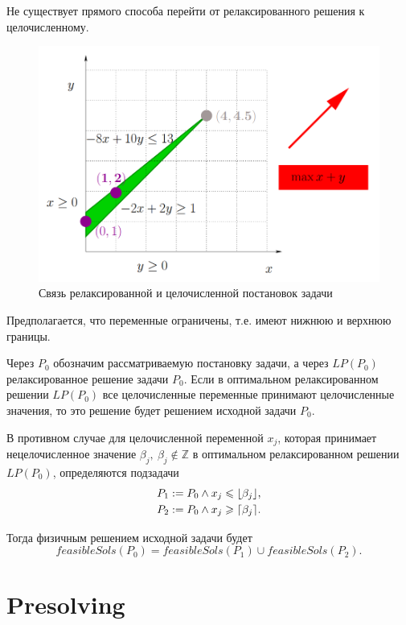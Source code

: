 \documentclass[%
	11pt,
	a4paper,
	utf8,
		]{article}
\begin{document}
Не существует прямого способа перейти от релаксированного решения к целочисленному.

\begin{figure}[h]
	\centering
	\includegraphics[scale=0.55]{figures/lp_and_mip.png}
	\caption{ Связь релаксированной и целочисленной постановок задачи }\label{fig:lp_and_mip}
\end{figure}

Предполагается, что переменные ограничены, т.е. имеют нижнюю и верхнюю границы.

Через $ P_0 $ обозначим рассматриваемую постановку задачи, а через $ LP(P_0) $ релаксированное решение задачи $ P_0 $. Если в оптимальном релаксированном решении $ LP(P_0) $ все целочисленные переменные принимают целочисленные значения, то это решение будет решением исходной задачи $ P_0 $.

В противном случае для целочисленной переменной $ x_j $, которая принимает нецелочисленное значение $ \beta_j, \ \beta_j \notin \mathbb{Z} $ в оптимальном релаксированном решении $ LP(P_0) $, определяются подзадачи
\begin{align*}
	P_1 := P_0 \wedge x_j \leqslant \floor*{\beta_j},\\
	P_2 := P_0 \wedge x_j \geqslant \ceil*{\beta_j}.
\end{align*}

Тогда физичным решением исходной задачи будет
$$
feasibleSols(P_0) = feasibleSols(P_1) \cup feasibleSols(P_2).
$$


\section{Presolving}
\end{document}
